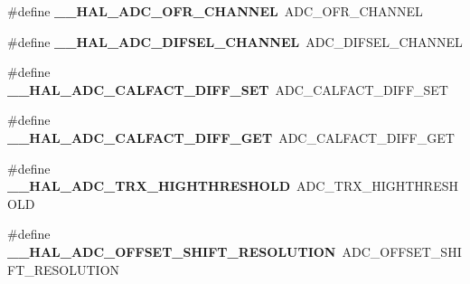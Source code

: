 \begin{DoxyCompactItemize}
\item 
\mbox{\label{group___h_a_l___a_d_c___aliased___macros_gad3ba77f5090921040fa9a63ff8d31241}} 
\#define {\bfseries \+\_\+\+\_\+\+H\+A\+L\+\_\+\+A\+D\+C\+\_\+\+O\+F\+R\+\_\+\+C\+H\+A\+N\+N\+EL}~A\+D\+C\+\_\+\+O\+F\+R\+\_\+\+C\+H\+A\+N\+N\+EL
\item 
\mbox{\label{group___h_a_l___a_d_c___aliased___macros_ga697c5bcf01d90462bf0c65c1434204a2}} 
\#define {\bfseries \+\_\+\+\_\+\+H\+A\+L\+\_\+\+A\+D\+C\+\_\+\+D\+I\+F\+S\+E\+L\+\_\+\+C\+H\+A\+N\+N\+EL}~A\+D\+C\+\_\+\+D\+I\+F\+S\+E\+L\+\_\+\+C\+H\+A\+N\+N\+EL
\item 
\mbox{\label{group___h_a_l___a_d_c___aliased___macros_ga0d6a948351847da8e821fd673cd5395c}} 
\#define {\bfseries \+\_\+\+\_\+\+H\+A\+L\+\_\+\+A\+D\+C\+\_\+\+C\+A\+L\+F\+A\+C\+T\+\_\+\+D\+I\+F\+F\+\_\+\+S\+ET}~A\+D\+C\+\_\+\+C\+A\+L\+F\+A\+C\+T\+\_\+\+D\+I\+F\+F\+\_\+\+S\+ET
\item 
\mbox{\label{group___h_a_l___a_d_c___aliased___macros_ga04d8142122bd9275a1219043edc63d98}} 
\#define {\bfseries \+\_\+\+\_\+\+H\+A\+L\+\_\+\+A\+D\+C\+\_\+\+C\+A\+L\+F\+A\+C\+T\+\_\+\+D\+I\+F\+F\+\_\+\+G\+ET}~A\+D\+C\+\_\+\+C\+A\+L\+F\+A\+C\+T\+\_\+\+D\+I\+F\+F\+\_\+\+G\+ET
\item 
\mbox{\label{group___h_a_l___a_d_c___aliased___macros_ga33afa59f288d4671512aed3dfb8f70b7}} 
\#define {\bfseries \+\_\+\+\_\+\+H\+A\+L\+\_\+\+A\+D\+C\+\_\+\+T\+R\+X\+\_\+\+H\+I\+G\+H\+T\+H\+R\+E\+S\+H\+O\+LD}~A\+D\+C\+\_\+\+T\+R\+X\+\_\+\+H\+I\+G\+H\+T\+H\+R\+E\+S\+H\+O\+LD
\item 
\mbox{\label{group___h_a_l___a_d_c___aliased___macros_ga0f83fc077ad488745139c8e24641d437}} 
\#define {\bfseries \+\_\+\+\_\+\+H\+A\+L\+\_\+\+A\+D\+C\+\_\+\+O\+F\+F\+S\+E\+T\+\_\+\+S\+H\+I\+F\+T\+\_\+\+R\+E\+S\+O\+L\+U\+T\+I\+ON}~A\+D\+C\+\_\+\+O\+F\+F\+S\+E\+T\+\_\+\+S\+H\+I\+F\+T\+\_\+\+R\+E\+S\+O\+L\+U\+T\+I\+ON
\item 
\mbox{\label{group___h_a_l___a_d_c___aliased___macros_ga616002cefa3a1ba7af4fa612afd02561}} 

\end{DoxyCompactItemize}
